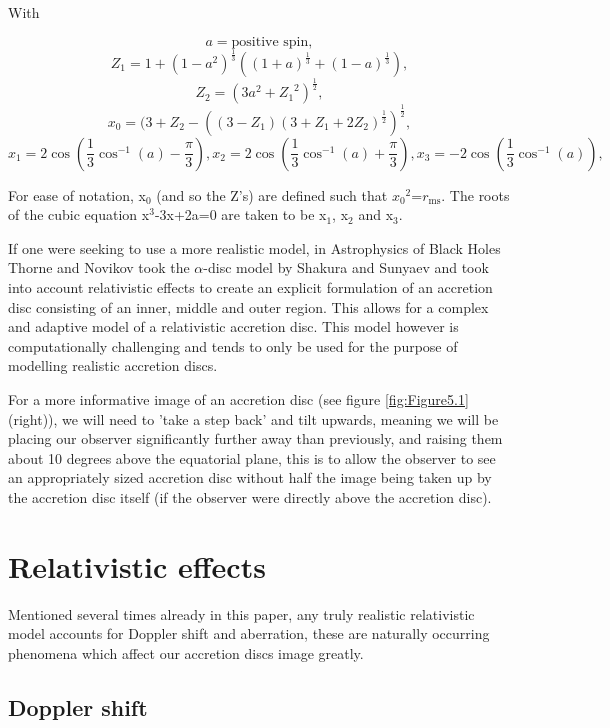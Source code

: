 \documentclass[oneside,openright,frontopenright, singlespacing]{dmathesis}
\begin{document}
\vspace{1em}
	With

	\[a = \mbox{positive spin},\]
	\[Z_1 = 1+(1-a^2)^{\frac{1}{3}}\left((1+a)^{\frac{1}{3}}+(1-a)^{\frac{1}{3}}\right),\]
	\[Z_2 = (3a^2+{Z_1}^2)^{\frac{1}{2}},\]
	\[x_0 = (3+Z_2-\left((3-Z_1)(3+Z_1+2Z_2)^{\frac{1}{2}}\right)^{\frac{1}{2}},\]
	\[x_1 = 2\cos\left(\frac{1}{3}\cos^{-1}(a)-\frac{\pi}{3}\right), x_2 =2\cos\left(\frac{1}{3}\cos^{-1}(a)+\frac{\pi}{3}\right) , x_3 = -2\cos\left(\frac{1}{3}\cos^{-1}(a)\right),\]

\vspace{1em}
	For ease of notation, x$_0$ (and so the Z's) are defined such that ${x_0}^2$=$r_{\mbox{ms}}$. The roots of the cubic equation x$^3$-3x+2a=0 are taken to be x$_1$, x$_2$ and x$_3$.

\vspace{1em}
	If one were seeking to use a more realistic model, in Astrophysics of Black Holes\cite{novikov1973astrophyics} Thorne and Novikov took the $\alpha$-disc model by Shakura and Sunyaev\cite{shakura1973black} and took into account relativistic effects to create an explicit formulation of an accretion disc consisting of an inner, middle and outer region. This allows for a complex and adaptive model of a relativistic accretion disc. This model however is computationally challenging and tends to only be used for the purpose of modelling realistic accretion discs.

\vspace{1em}
	For a more informative image of an accretion disc (see figure \ref{fig:Figure5.1} (right)), we will need to 'take a step back' and tilt upwards, meaning we will be placing our observer significantly further away than previously, and raising them about 10 degrees above the equatorial plane, this is to allow the observer to see an appropriately sized accretion disc without half the image being taken up by the accretion disc itself (if the observer were directly above the accretion disc).

\section{Relativistic effects}\label{sec:Section5.2}

	Mentioned several times already in this paper, any truly realistic relativistic model accounts for Doppler shift and aberration, these are naturally occurring phenomena which affect our accretion discs image greatly.

\subsection{Doppler shift}\label{subsec:Subsection5.2.1}
\end{document}
